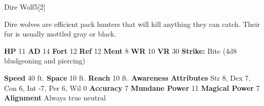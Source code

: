  \begin{monsection}{Dire Wolf}{5}[2]
    \vspace{-1em}\vspace{-1em}
    \vspace{0em}

    
      Dire wolves are efficient pack hunters that will kill anything they can catch.
      Their fur is usually mottled gray or black.
    
    

    \begin{spellcontent}
      \begin{spelltargetinginfo}
        \pari \textbf{HP} 11 \monsep
          \textbf{AD} 14 \monsep
          \textbf{Fort} 12 \monsep
          \textbf{Ref} 12 \monsep
          \textbf{Ment} 8
        \pari \textbf{WR} 10 \monsep
        \textbf{VR} 30
        \pari \textbf{Strike:}
            Bite  (4d8 bludgeoning and piercing)
      \end{spelltargetinginfo}
    \end{spellcontent}
    \begin{monsterfooter}
      \pari \textbf{Speed} 40 ft. \monsep
        \textbf{Space} 10 ft. \monsep
        \textbf{Reach} 10 ft.
      \pari \textbf{Awareness} 
      \pari \textbf{Attributes}
        Str 8, Dex 7,
        Con 6, Int -7,
        Per 6, Wil 0
      \pari \textbf{Accuracy} 7 \monsep
        \textbf{Mundane Power} 11 \monsep
      \textbf{Magical Power} 7
      \pari \textbf{Alignment} Always true neutral
    \end{monsterfooter}
  \end{monsection}
  
